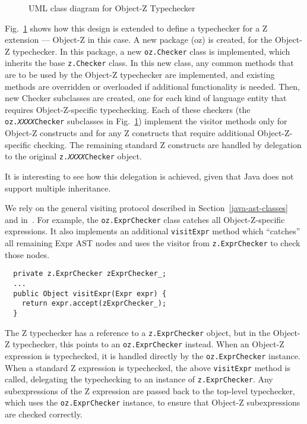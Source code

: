 \documentclass{llncs}
\begin{document}
\def\epsfsize#1#2{0.50#1}
\begin{figure}[t]
\begin{center}
\caption{UML class diagram for Object-Z Typechecker}\label{fig:oztypechecker}
\end{center}
\end{figure}
\def\epsfsize#1#2{\epsfxsize}

Fig.~\ref{fig:oztypechecker} shows how this design is extended to
define a typechecker for a Z extension --- Object-Z in this case.  A
new package (oz) is created, for the Object-Z typechecker.  In this
package, a new {\tt oz.Checker} class is implemented, which inherits
the base {\tt z.Checker} class.  In this new class, any common methods
that are to be used by the Object-Z typechecker are implemented, and
existing methods are overridden or overloaded if additional
functionality is needed.  Then, new Checker subclasses are created,
one for each kind of language entity that requires Object-Z-specific
typechecking.  Each of these checkers (the
\texttt{oz.\emph{XXXX}Checker} subclasses in
Fig.~\ref{fig:oztypechecker}) implement the visitor methods only for
Object-Z constructs and for any Z constructs that require additional
Object-Z-specific checking.  The remaining standard Z constructs are
handled by delegation to the original
\texttt{z.\emph{XXXX}Checker} object.

It is interesting to see how this delegation is achieved, given that
Java does not support multiple inheritance.

We rely on the general
visiting protocol described in Section~\ref{java-ast-classes} and
in~\cite{czt}.  For example, the \texttt{oz.ExprChecker} class catches
all Object-Z-specific expressions.  It also implements an additional
\texttt{visitExpr} method which ``catches'' all remaining Expr AST
nodes and uses the visitor from \texttt{z.ExprChecker} to check those
nodes.
\begin{verbatim}
  private z.ExprChecker zExprChecker_;
  ...
  public Object visitExpr(Expr expr) {
    return expr.accept(zExprChecker_);
  }
\end{verbatim}

The Z typechecker has a reference to a \texttt{z.ExprChecker} object,
but in the Object-Z typechecker, this points to an \texttt{oz.ExprChecker}
instead.  When an Object-Z expression is typechecked, it is handled
directly by the \texttt{oz.ExprChecker} instance.  When a standard Z
expression is typechecked, the above \texttt{visitExpr} method
is called, delegating the typechecking to an instance of
\texttt{z.ExprChecker}.  Any subexpressions of the Z expression are
passed back to the top-level type\-chec\-ker, which uses the
\texttt{oz.Expr\-Chec\-ker} instance, to ensure that Ob\-ject-Z subexpressions
are checked correctly.
\end{document}
